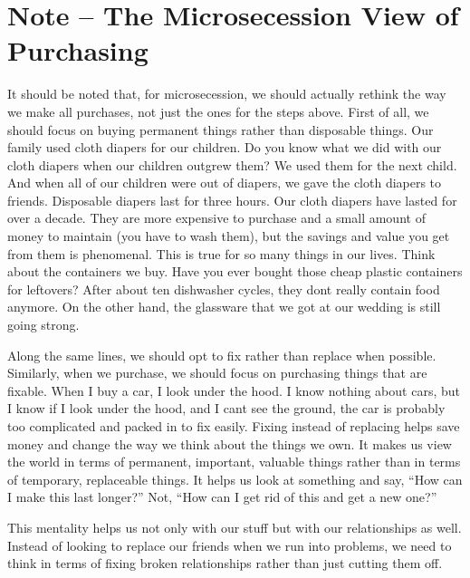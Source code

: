 \documentclass[letterpaper]{article}
\begin{document}
\section[Note – The Microsecession View of Purchasing]{Note – The
Microsecession View of Purchasing}
{\color{black}
It should be noted that, for microsecession, we should actually rethink
the way we make all purchases, not just the ones for the steps above.
First of all, we should focus on buying permanent things rather than
disposable things. Our family used cloth diapers for our children. Do
you know what we did with our cloth diapers when our children outgrew
them?  We used them for the next child. And when all of our children
were out of diapers, we gave the cloth diapers to friends.
\textcolor[rgb]{0.32941177,0.5529412,0.83137256}{Disposable} diapers
last for three hours. Our cloth diapers have lasted for over a decade.
They are more expensive to purchase and a small amount of money to
maintain (you have to wash them), but the savings and value you get
from them is phenomenal. This is true for so many things in our lives.
Think about the containers we buy. Have you ever bought those cheap
plastic containers for leftovers?  After about ten dishwasher cycles,
they don{\textquotesingle}t really contain food anymore. On the other
hand, the glassware that we got at our wedding is still going strong. }

{\color{black}
Along the same lines, we should opt to fix rather than replace when
possible. Similarly, when we purchase, we should focus on purchasing
things that are fixable. When I buy a car, I look under the hood. I
know nothing about cars, but I know if I look under the hood, and I
can{\textquotesingle}t see the ground, the car is probably too
complicated and packed in to fix easily. Fixing instead of replacing
helps save money \textcolor[rgb]{0.32941177,0.5529412,0.83137256}{and}
change the way we think about the things we own. It makes us view the
world in terms of permanent, important, valuable things rather than in
terms of temporary, replaceable things. It helps us look at
\textcolor[rgb]{0.32941177,0.5529412,0.83137256}{something} and say,
“How can I make this last longer?” Not, “How can I get rid of this and
get a new one?”  }

{\color{black}
This mentality helps us not only with our
\textcolor[rgb]{0.32941177,0.5529412,0.83137256}{stuff} but
\textcolor[rgb]{0.32941177,0.5529412,0.83137256}{with }our
relationships as well. Instead of looking to replace our friends when
we run into problems,
\textcolor[rgb]{0.32941177,0.5529412,0.83137256}{we} need to think in
terms of fixing broken relationships rather than just cutting them
off.}
\end{document}
